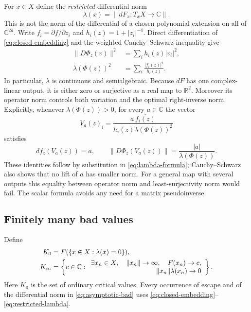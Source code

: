 \documentclass[11pt]{article}
\numberwithin{equation}{section}
\theoremstyle{definition}
\theoremstyle{remark}
\newcommand{\C}{\mathbb C}
\newcommand{\R}{\mathbb R}
\begin{document}
For $x\in X$ define the \emph{restricted} differential norm
\begin{equation}\label{eq:restricted-lambda}
 \lambda(x)=\|dF_x:T_xX\longrightarrow\C\|.
\end{equation}
This is not the norm of the differential of a chosen polynomial extension
on all of $\C^{2d}$. Write $f_i=\partial f/\partial z_i$ and
$h_i(z)=1+|z_i|^{-4}$. Direct differentiation of \eqref{eq:closed-embedding}
and the weighted Cauchy--Schwarz inequality give
\begin{align}
 \|D\Phi_z(v)\|^2&=\sum_i h_i(z)|v_i|^2,
       \label{eq:embedding-metric}\\
 \lambda(\Phi(z))^2&=\sum_i\frac{|f_i(z)|^2}{h_i(z)}.
       \label{eq:lambda-formula}
\end{align}
In particular, $\lambda$ is continuous and semialgebraic.
Because $dF$ has one complex-linear output, it is either zero or
surjective as a real map to $\R^2$. Moreover its operator norm controls
both variation and the optimal right-inverse norm. Explicitly, whenever
$\lambda(\Phi(z))>0$, for every $a\in\C$ the vector
\begin{equation}\label{eq:gradient-lift}
 V_a(z)_i=\frac{a\,\overline{f_i(z)}}
                  {h_i(z)\lambda(\Phi(z))^2}
\end{equation}
satisfies
\begin{equation}\label{eq:gradient-identities}
 df_z(V_a(z))=a,\qquad
 \|D\Phi_z(V_a(z))\|=\frac{|a|}{\lambda(\Phi(z))}.
\end{equation}
These identities follow by substitution in \eqref{eq:lambda-formula};
Cauchy--Schwarz also shows that no lift of $a$ has smaller norm.
For a general map with several outputs this equality between operator
norm and least-surjectivity norm would fail. The scalar formula avoids
any need for a matrix pseudoinverse.

\subsection{Finitely many bad values}
Define
\begin{align}
 K_0&=F(\{x\in X:\lambda(x)=0\}),\label{eq:ordinary-bad}\\
 K_\infty&=\left\{c\in\C:
 \begin{array}{l}
  \exists x_n\in X,\quad \|x_n\|\to\infty,\quad F(x_n)\to c,\\
  \hfill \|x_n\|\lambda(x_n)\to0
 \end{array}\right\}.\label{eq:asymptotic-bad}
\end{align}
Here $K_0$ is the set of ordinary critical values. Every occurrence of
escape and of the differential norm in \eqref{eq:asymptotic-bad} uses
\eqref{eq:closed-embedding}--\eqref{eq:restricted-lambda}.
\end{document}
